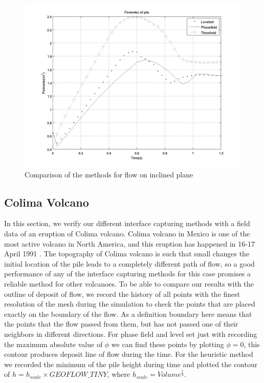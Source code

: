 \documentclass[letterpaper,10pt]{article}
\begin{document}
\begin{figure}[H]
\begin{minipage}[b]{.48 \linewidth}
    \includegraphics[scale=0.4]{IMAGES/perimeter.png}
  \end{minipage}
  \caption{Comparison of the methods for flow on inclined plane}
  \label{compinc}
\end{figure}

\subsection{Colima Volcano}
In this section, we verify our different interface capturing methods with a field data of an eruption of Colima volcano. 
Colima volcano in Mexico is one of the most active volcano in North America, and this eruption has happened in 16-17 April 1991 \cite{Charbonnier2008}. 
The topography of Colima volcano is such that small changes the initial location of the pile leads to a completely different 
path of flow, so a good performance of any of the interface capturing methods for this case promises a reliable method for other volcanoes.
To be able to compare our results with the outline of deposit of flow, we record the history of all points with the finest 
resolution of the mesh during the simulation to check the points that are placed exactly on the boundary of the flow. 
As a definition boundary here means that the points that the flow passed from them, but has not passed one of their neighbors 
in different directions. For phase field and level set just with recording the maximum absolute value of $ \phi $ we can find 
these points by plotting $\phi=0$, this contour produces deposit line of flow during the time. For the heuristic method we 
recorded the minimum of the pile height during time and plotted the contour of $ h = h_{scale} \times GEOFLOW \_ TINY$, where 
$ h_{scale} =Volume^\frac{1}{3} $.
\end{document}
